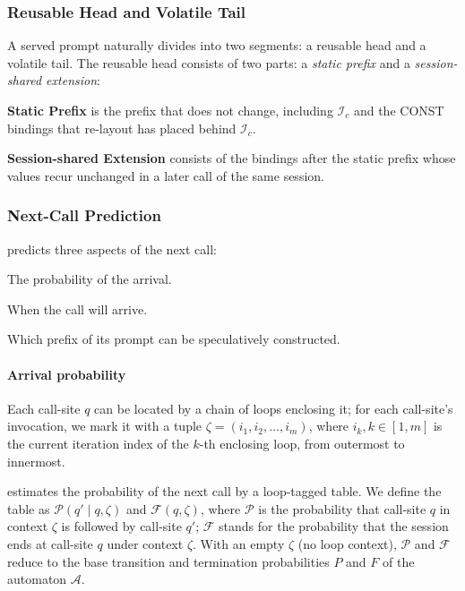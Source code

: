 \subsubsection{Reusable Head and Volatile Tail}
\label{sec:identify_reusable_kv}
A served prompt naturally divides into two segments: a reusable head and a volatile tail. The reusable head consists of two parts: a \emph{static prefix} and a \emph{session-shared extension}:
\begin{enumerate*}[label=(\roman*)]
    \item \textbf{Static Prefix} is the prefix that does not change, including $\mathcal{I}_c$ and the CONST bindings that re-layout has placed behind $\mathcal{I}_c$.
    \item \textbf{Session-shared Extension} consists of the bindings after the static prefix whose values recur unchanged in a later call of the same session.
\end{enumerate*}

\subsubsection{Next-Call Prediction}
\sysname predicts three aspects of the next call:
\begin{enumerate*}[label=(\roman*)]
    \item The probability of the arrival.
    \item When the call will arrive.
    \item Which prefix of its prompt can be speculatively constructed.
\end{enumerate*}

\paragraph{Arrival probability}
Each call-site $q$ can be located by a chain of loops enclosing it; for each call-site's invocation, we mark it with a tuple $\zeta=\left(i_1, i_2, \dots, i_m\right)$, where $i_k, k \in \left[1, m\right]$ is the current iteration index of the $k$-th enclosing loop, from outermost to innermost. 

\sysname estimates the probability of the next call by a loop-tagged table. We define the table as $\mathcal{P}(q' \mid q, \zeta)$ and $\mathcal{F}(q, \zeta)$, where $\mathcal{P}$ is the probability that call-site $q$ in context $\zeta$ is followed by call-site $q'$; $\mathcal{F}$ stands for the probability that the session ends at call-site $q$ under context $\zeta$. With an empty $\zeta$ (no loop context), $\mathcal{P}$ and $\mathcal{F}$ reduce to the base transition and termination probabilities $P$ and $F$ of the automaton $\mathcal{A}$.


